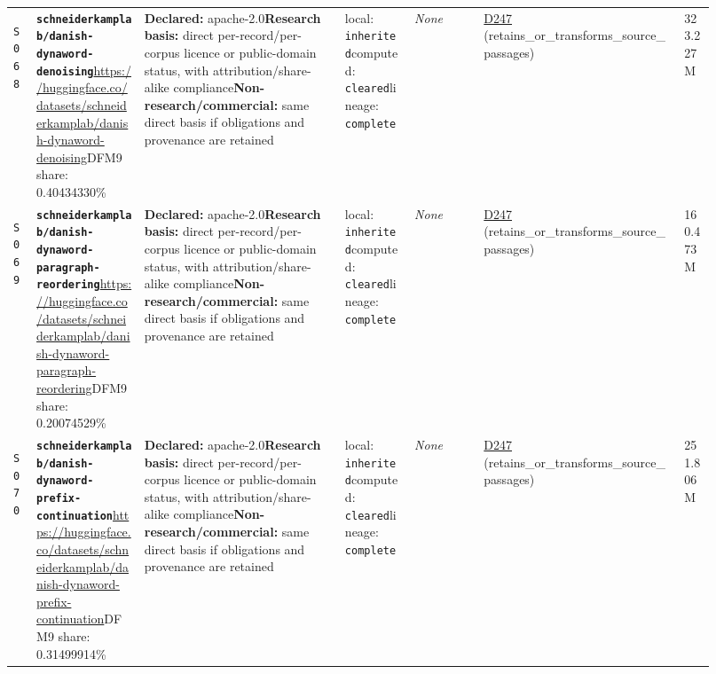 \documentclass[9pt,a4paper]{article}
\newcommand{\srcid}[1]{\hypertarget{src:#1}{\texttt{#1}}}
\begin{document}
\begin{landscape}
\begin{longtable}{@{}L{0.03\linewidth}L{0.14\linewidth}L{0.26\linewidth}L{0.09\linewidth}L{0.09\linewidth}L{0.265\linewidth}L{0.045\linewidth}@{}}
\srcid{S068} & \textbf{\nolinkurl{schneiderkamplab/danish-dynaword-denoising}}\newline \url{https://huggingface.co/datasets/schneiderkamplab/danish-dynaword-denoising}\newline DFM9 share: 0.40434330\% & \textbf{Declared:} apache-2.0\newline \textbf{Research basis:} direct per-record/per-corpus licence or public-domain status, with attribution/share-alike compliance\newline \textbf{Non-research/commercial:} same direct basis if obligations and provenance are retained & local: \texttt{inherited}\newline computed: \texttt{cleared}\newline lineage: \texttt{complete} & \textit{None} & \hyperlink{dep:D247}{D247} (retains\_or\_transforms\_source\_passages) & 323.227M \\
\srcid{S069} & \textbf{\nolinkurl{schneiderkamplab/danish-dynaword-paragraph-reordering}}\newline \url{https://huggingface.co/datasets/schneiderkamplab/danish-dynaword-paragraph-reordering}\newline DFM9 share: 0.20074529\% & \textbf{Declared:} apache-2.0\newline \textbf{Research basis:} direct per-record/per-corpus licence or public-domain status, with attribution/share-alike compliance\newline \textbf{Non-research/commercial:} same direct basis if obligations and provenance are retained & local: \texttt{inherited}\newline computed: \texttt{cleared}\newline lineage: \texttt{complete} & \textit{None} & \hyperlink{dep:D247}{D247} (retains\_or\_transforms\_source\_passages) & 160.473M \\
\srcid{S070} & \textbf{\nolinkurl{schneiderkamplab/danish-dynaword-prefix-continuation}}\newline \url{https://huggingface.co/datasets/schneiderkamplab/danish-dynaword-prefix-continuation}\newline DFM9 share: 0.31499914\% & \textbf{Declared:} apache-2.0\newline \textbf{Research basis:} direct per-record/per-corpus licence or public-domain status, with attribution/share-alike compliance\newline \textbf{Non-research/commercial:} same direct basis if obligations and provenance are retained & local: \texttt{inherited}\newline computed: \texttt{cleared}\newline lineage: \texttt{complete} & \textit{None} & \hyperlink{dep:D247}{D247} (retains\_or\_transforms\_source\_passages) & 251.806M \\

\end{longtable}
\end{landscape}
\end{document}
